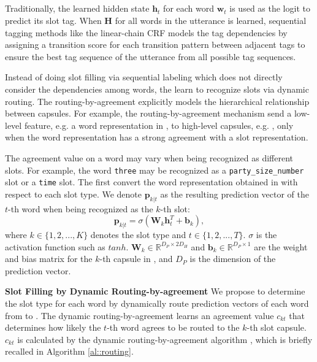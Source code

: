 \subsection{\SecondCapsule}
Traditionally, the learned hidden state \(\mathbf{h}_t\) for each word \(\mathbf{w}_t\) is used as the logit to predict its slot tag. When $\mathbf{H}$ for all words in the utterance is learned, sequential tagging methods like the linear-chain CRF models the tag dependencies by assigning a transition score for each transition pattern between adjacent tags to ensure the best tag sequence of the utterance from all possible tag sequences.

Instead of doing slot filling via sequential labeling which does not directly consider the dependencies among words, the {\SecondCapsule} learn to recognize slots via dynamic routing. The routing-by-agreement explicitly models the hierarchical relationship between capsules. For example, the routing-by-agreement mechanism send a low-level feature, e.g. a word representation in {\FirstCapsule}, to high-level capsules, e.g. {\SecondCapsule}, only when the word representation has a strong agreement with a slot representation.

The agreement value on a word may vary when being recognized as different slots. For example, the word \texttt{three} may be recognized as a \texttt{party\_size\_number} slot or a \texttt{time} slot.  The {\SecondCapsule} first convert the word representation obtained in {\FirstCapsule} with respect to each slot type. We denote \(\mathbf{p}_{k|t}\) as the resulting prediction vector of the $t$-th word when being recognized as the $k$-th slot:
\begin{equation}
    \mathbf{p}_{k|t} = \sigma(\mathbf{W}_{k}\mathbf{h}_{t}^{T} + \mathbf{b}_{k}),
\end{equation}
where $k\in\{1, 2, ..., K\}$ denotes the slot type and $t\in\{1, 2, ..., T\}$. $\sigma$ is the activation function such as $tanh$. $\mathbf{W}_{k}\in \mathbb{R}^{{D_P}\times{2D_H}}$ and $\mathbf{b}_{k} \in \mathbb{R}^{D_P\times 1}$ are the weight and bias matrix for the $k$-th capsule in {\SecondCapsule}, and ${D_P}$ is the dimension of the prediction vector.

\noindent\textbf{Slot Filling by Dynamic Routing-by-agreement}
We propose to determine the slot type for each word by dynamically route prediction vectors of each word from {\FirstCapsule} to {\SecondCapsule}.
The dynamic routing-by-agreement learns an agreement value \(c_{kt}\) that determines how likely the $t$-th word agrees to be routed to the $k$-th slot capsule.  \(c_{kt}\) is calculated by the dynamic routing-by-agreement algorithm \citep{sabour2017dynamic}, which is briefly recalled in Algorithm \ref{al::routing}.

